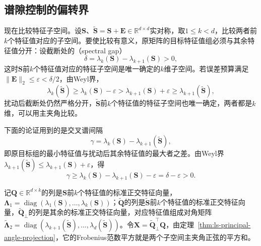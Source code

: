 \subsection{谱隙控制的偏转界}

现在比较特征子空间。设$\bm S$、$\widetilde{\bm S}=\bm S+\bm E\in\mathbb R^{d\times d}$实对称，取$1\leq k<d$，比较两者前$k$个特征值对应的子空间。要使比较有意义，原矩阵的目标特征值组必须与其余特征值分开：设截断处的（spectral gap）
\[
 \delta=\lambda_k(\bm S)-\lambda_{k+1}(\bm S)>0 ,
\]
这时$\bm S$前$k$个特征值对应的特征子空间是唯一确定的$k$维子空间。若误差预算满足$\lVert\bm E\rVert_2\leq\varepsilon<\delta/2$，由Weyl界，
\[
 \lambda_k(\widetilde{\bm S})\geq\lambda_k(\bm S)-\varepsilon>\lambda_{k+1}(\bm S)+\varepsilon\geq\lambda_{k+1}(\widetilde{\bm S}),
\]
扰动后截断处仍然严格分开，$\widetilde{\bm S}$前$k$个特征值的特征子空间也唯一确定，两者都是$k$维，可以用主夹角比较。

下面的论证用到的是交叉谱间隔
\[
 \gamma=\lambda_k(\bm S)-\lambda_{k+1}(\widetilde{\bm S}),
\]
即原目标组的最小特征值与扰动后其余特征值的最大者之差。由Weyl界$\lambda_{k+1}(\widetilde{\bm S})\leq\lambda_{k+1}(\bm S)+\varepsilon$，得
\[
 \gamma\geq\lambda_k(\bm S)-\lambda_{k+1}(\bm S)-\varepsilon=\delta-\varepsilon>0 .
\]

记$\bm Q\in\mathbb R^{d\times k}$的列是$\bm S$前$k$个特征值的标准正交特征向量，$\bm\Lambda_1=\operatorname{diag}(\lambda_1(\bm S),\ldots,\lambda_k(\bm S))$；$\widetilde{\bm Q}$的列是$\widetilde{\bm S}$前$k$个特征值的标准正交特征向量，$\widetilde{\bm Q}_\perp$的列是其余的标准正交特征向量，对应特征值组成对角矩阵$\widetilde{\bm\Lambda}_2=\operatorname{diag}(\lambda_{k+1}(\widetilde{\bm S}),\ldots,\lambda_d(\widetilde{\bm S}))$。令$\bm X=\widetilde{\bm Q}_\perp^\top\bm Q$，由定理~\ref{thm:ls-principal-angle-projection}，它的Frobenius范数平方就是两个子空间主夹角正弦的平方和。

